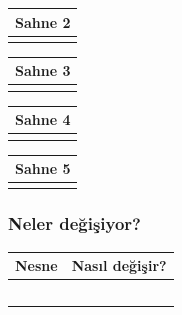 \documentclass[12pt, a4paper]{article}
\begin{document}
\vspace{5ex}
\noindent
\begin{tabular}{| p{16.5cm}  |  }
\hline			
Sahne 2\\
\hline
 \\[50ex]
\hline  
\end{tabular}

\vspace{5ex}
\noindent
\begin{tabular}{| p{16.5cm}  |  }
\hline			
Sahne 3\\
\hline
 \\[50ex]
\hline  
\end{tabular}

\vspace{5ex}
\noindent
\begin{tabular}{| p{16.5cm}  |  }
\hline			
Sahne 4\\
\hline
 \\[50ex]
\hline  
\end{tabular}

\vspace{5ex}
\noindent
\begin{tabular}{| p{16.5cm}  |  }
\hline			
Sahne 5\\
\hline
 \\[50ex]
\hline  
\end{tabular}

\subsubsection*{Neler değişiyor?}
\begin{tabular}{| p{4cm} | p{11cm} |  }
\hline			
Nesne&Nasıl değişir?\\
\hline
& \\[6ex]
\hline  
& \\[6ex]
\hline  
& \\[6ex]
\hline  
& \\[6ex]
\hline  
& \\[6ex]
\hline  
\end{tabular}

\end{document}

